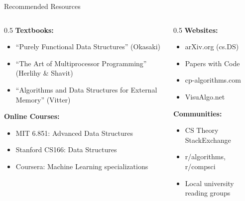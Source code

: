 \documentclass[aspectratio=169,xcolor=dvipsnames]{beamer}
\begin{document}
\begin{frame}{Recommended Resources}
  \begin{columns}
    \begin{column}{0.5\textwidth}
      \textbf{Textbooks:}
      \begin{itemize}
        \item ``Purely Functional Data Structures'' (Okasaki)
        \item ``The Art of Multiprocessor Programming'' (Herlihy \& Shavit)
        \item ``Algorithms and Data Structures for External Memory'' (Vitter)
      \end{itemize}

      \vspace{0.3cm}
      \textbf{Online Courses:}
      \begin{itemize}
        \item MIT 6.851: Advanced Data Structures
        \item Stanford CS166: Data Structures
        \item Coursera: Machine Learning specializations
      \end{itemize}
    \end{column}

    \begin{column}{0.5\textwidth}
      \textbf{Websites:}
      \begin{itemize}
        \item arXiv.org (cs.DS)
        \item Papers with Code
        \item cp-algorithms.com
        \item VisuAlgo.net
      \end{itemize}

      \vspace{0.3cm}
      \textbf{Communities:}
      \begin{itemize}
        \item CS Theory StackExchange
        \item r/algorithms, r/compsci
        \item Local university reading groups
      \end{itemize}
    \end{column}
  \end{columns}
\end{frame}
\end{document}
